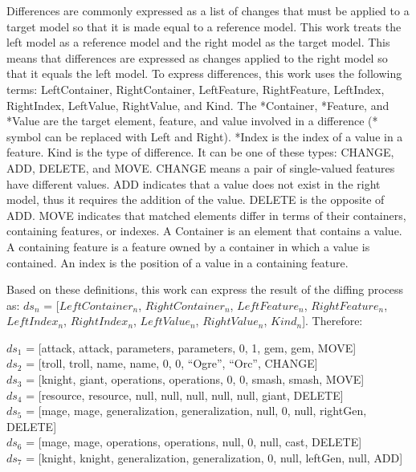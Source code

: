 Differences are commonly expressed as a list of changes that must be applied to a target model so that it is made equal to a reference model. This work treats the left model as a reference model and the right model as the target model. This means that differences are expressed as changes applied to the right model so that it equals the left model. To express differences, this work uses the following terms: \textsf{LeftContainer}, \textsf{RightContainer}, \textsf{LeftFeature}, \textsf{RightFeature}, \textsf{LeftIndex}, \textsf{RightIndex}, \textsf{LeftValue}, \textsf{RightValue}, and \textsf{Kind}. The \textsf{*Container}, \textsf{*Feature}, and \textsf{*Value} are the target element, feature, and value involved in a difference (\textsf{*} symbol can be replaced with \textsf{Left} and \textsf{Right}). \textsf{*Index} is the index of a value in a feature. \textsf{Kind} is the type of difference. It can be one of these types: \textsf{CHANGE}, \textsf{ADD}, \textsf{DELETE}, and \textsf{MOVE}. \textsf{CHANGE} means a pair of single-valued features have different values. \textsf{ADD} indicates that a value does not exist in the right model, thus it requires the addition of the value. \textsf{DELETE} is the opposite of \textsf{ADD}. \textsf{MOVE} indicates that matched elements differ in terms of their containers, containing features, or indexes. A Container is an element that contains a value. A containing feature is a feature owned by a container in which a value is contained. An index is the position of a value in a containing feature.

Based on these definitions, this work can express the result of the diffing process as: $ds_{n}$ = [$LeftContainer_n$, $RightContainer_n$, $LeftFeature_n$, $RightFeature_n$, $LeftIndex_n$, $RightIndex_n$, $LeftValue_n$, $RightValue_n$, $Kind_n$]. Therefore:

$ds_{1}$ =  [\textsf{attack}, \textsf{attack}, \textsf{parameters}, \textsf{parameters}, 0, 1, \textsf{gem}, \textsf{gem}, \textsf{MOVE}]\\
$ds_{2}$ = [\textsf{troll}, \textsf{troll}, \textsf{name}, \textsf{name}, 0, 0, ``Ogre'', ``Orc'', \textsf{CHANGE}]\\
$ds_{3}$ = [\textsf{knight}, \textsf{giant}, \textsf{operations}, \textsf{operations}, 0, 0, \textsf{smash}, \textsf{smash}, \textsf{MOVE}]\\
$ds_{4}$ = [\textsf{resource}, \textsf{resource}, \textsf{null}, \textsf{null}, \textsf{null}, \textsf{null}, \textsf{null}, \textsf{giant}, \textsf{DELETE}]\\
$ds_{5}$ = [\textsf{mage}, \textsf{mage}, \textsf{generalization}, \textsf{generalization}, \textsf{null}, 0, \textsf{null}, \textsf{rightGen}, \textsf{DELETE}] \\
$ds_{6}$ = [\textsf{mage}, \textsf{mage}, \textsf{operations}, \textsf{operations}, \textsf{null}, 0, \textsf{null}, \textsf{cast}, \textsf{DELETE}]\\
$ds_{7}$ = [\textsf{knight}, \textsf{knight}, \textsf{generalization}, \textsf{generalization}, 0, \textsf{null}, \textsf{leftGen}, \textsf{null}, \textsf{ADD}]

